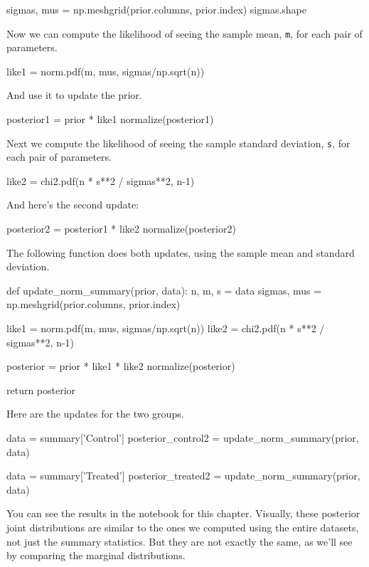 \documentclass[12pt]{book}
\theoremstyle{exercise}
\newcommand{\py}[1]{{\tt #1}}%
\begin{document}
\begin{code}
sigmas, mus = np.meshgrid(prior.columns, prior.index)
sigmas.shape
\end{code}

Now we can compute the likelihood of seeing the sample mean,
\py{m}, for each pair of parameters.

\begin{code}
like1 = norm.pdf(m, mus, sigmas/np.sqrt(n))
\end{code}

And use it to update the prior.

\begin{code}
posterior1 = prior * like1
normalize(posterior1)
\end{code}

Next we compute the likelihood of seeing the sample standard deviation, \py{s}, for each pair of parameters.

\begin{code}
like2 = chi2.pdf(n * s**2 / sigmas**2, n-1)
\end{code}

And here's the second update:

\begin{code}
posterior2 = posterior1 * like2
normalize(posterior2)
\end{code}

The following function does both updates, using the sample mean and
standard deviation.

\begin{code}
def update_norm_summary(prior, data):
    n, m, s = data
    sigmas, mus = np.meshgrid(prior.columns, prior.index)

    like1 = norm.pdf(m, mus, sigmas/np.sqrt(n))
    like2 = chi2.pdf(n * s**2 / sigmas**2, n-1)

    posterior = prior * like1 * like2
    normalize(posterior)

    return posterior
\end{code}

Here are the updates for the two groups.

\begin{code}
data = summary['Control']
posterior_control2 = update_norm_summary(prior, data)

data = summary['Treated']
posterior_treated2 = update_norm_summary(prior, data)
\end{code}

You can see the results in the notebook for this chapter.
Visually, these posterior joint distributions are similar to the ones we
computed using the entire datasets, not just the summary statistics.
But they are not exactly the same, as we'll see by comparing the marginal
distributions.
\end{document}
